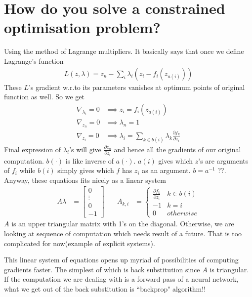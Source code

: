 \documentclass[12pt,crop=false,class=article,convert={density=300,outext=.compiled.png}]{standalone}
\begin{document}
\section*{How do you solve a constrained optimisation problem?}
Using the method of Lagrange multipliers. It
basically says that once we define Lagrange's function
%
 \begin{align*}
L(z,\lambda) = z_n - \sum_i\lambda_i(z_i - f_i(z_{a(i)}))
\end{align*}
%
These $L$'s gradient w.r.to its parameters vanishes at optimum points of
original function as well. So we get
%
 \begin{align*}
  \nabla_{\lambda_i}=0 &\implies z_i = f_i(z_{a(i)})
  \\
  \nabla_{z_n}=0        &\implies \lambda_n = 1
  \\ 
  \nabla_{z_i}=0        &\implies \lambda_i = \sum_{k\in b(i)}\lambda_k \frac{\partial f_k}{\partial z_i}
\end{align*}
%
Final expression of $\lambda_i$'s will give
$\frac{\partial z_n}{\partial z_i}$ and hence all the gradients of our
original computation. $b(\cdot)$ is like inverse of $a(\cdot)$. $a(i)$
gives which $z$'s are arguments of $f_i$ while $b(i)$ simply gives which
$f$ has $z_i$ as an argument. $b=a^{-1}$ ??. Anyway, these equations
fits nicely as a linear system
%
\begin{align*}
A\lambda &= 
\begin{bmatrix}
0\\
\vdots\\
0\\
-1
\end{bmatrix}
\quad
& A_{k,i} &= 
\begin{cases}
   \frac{\partial f_k}{\partial z_i} & k\in b(i)
\\ -1 & k=i
\\ 0 & otherwise
\end{cases}
\end{align*}
%
$A$ is an upper triangular matrix with 1's on the diagonal. Otherwise,
we are looking at sequence of computation which needs result of a
future. That is too complicated for now(example of explicit systems).

This linear system of equations opens up myriad of possibilities of
computing gradients faster. The simplest of which is back substitution
since $A$ is triangular. If the computation we are dealing with is a
forward pass of a neural network, what we get out of the back
substitution is ``backprop" algorithm!!
\end{document}

